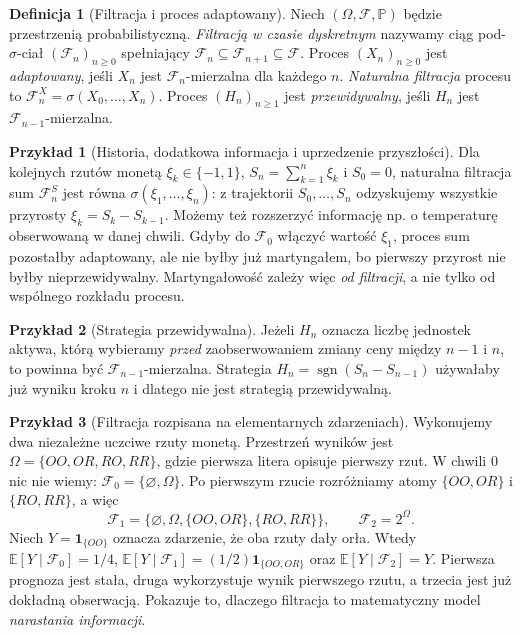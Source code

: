 \documentclass[11pt,a4paper,oneside]{report}
\numberwithin{equation}{chapter}
\theoremstyle{plain}
\theoremstyle{definition}
\newtheorem{definicja}{Definicja}[chapter]
\newtheorem{przyklad}{Przykład}[chapter]
\theoremstyle{remark}
\newcommand{\Prob}{\mathbb{P}}
\newcommand{\E}{\mathbb{E}}
\newcommand{\ind}[1]{\mathbf{1}_{#1}}
\begin{document}
\begin{definicja}[Filtracja i proces adaptowany]
Niech $(\Omega,\mathcal F,\Prob)$ będzie przestrzenią
probabilistyczną. \emph{Filtracją w czasie dyskretnym}
nazywamy ciąg pod-$\sigma$-ciał
$(\mathcal F_n)_{n\geq0}$ spełniający
$\mathcal F_n\subseteq\mathcal F_{n+1}\subseteq\mathcal F$.
Proces $(X_n)_{n\geq0}$ jest \emph{adaptowany}, jeśli
$X_n$ jest $\mathcal F_n$-mierzalna dla każdego $n$.
\emph{Naturalna filtracja} procesu to
$\mathcal F_n^X=\sigma(X_0,\ldots,X_n)$.
Proces $(H_n)_{n\geq1}$ jest \emph{przewidywalny},
jeśli $H_n$ jest $\mathcal F_{n-1}$-mierzalna.
\end{definicja}

\begin{przyklad}[Historia, dodatkowa informacja i uprzedzenie przyszłości]
Dla kolejnych rzutów monetą $\xi_k\in\{-1,1\}$,
$S_n=\sum_{k=1}^n\xi_k$ i $S_0=0$, naturalna
filtracja sum $\mathcal F_n^S$ jest równa
$\sigma(\xi_1,\ldots,\xi_n)$: z trajektorii
$S_0,\ldots,S_n$ odzyskujemy wszystkie przyrosty
$\xi_k=S_k-S_{k-1}$. Możemy też rozszerzyć informację
np. o temperaturę obserwowaną w danej chwili.
Gdyby do $\mathcal F_0$ włączyć wartość
$\xi_1$, proces sum pozostałby adaptowany, ale
nie byłby już martyngałem, bo pierwszy przyrost
nie byłby nieprzewidywalny. Martyngałowość
zależy więc \emph{od filtracji}, a nie tylko od
wspólnego rozkładu procesu.
\end{przyklad}

\begin{przyklad}[Strategia przewidywalna]
Jeżeli $H_n$ oznacza liczbę jednostek aktywa,
którą wybieramy \emph{przed} zaobserwowaniem
zmiany ceny między $n-1$ i $n$, to powinna być
$\mathcal F_{n-1}$-mierzalna. Strategia
$H_n=\operatorname{sgn}(S_n-S_{n-1})$ używałaby
już wyniku kroku $n$ i dlatego nie jest
strategią przewidywalną.
\end{przyklad}


\begin{przyklad}[Filtracja rozpisana na elementarnych zdarzeniach]
Wykonujemy dwa niezależne uczciwe rzuty monetą.
Przestrzeń wyników jest
$\Omega=\{OO,OR,RO,RR\}$, gdzie pierwsza litera
opisuje pierwszy rzut. W chwili $0$ nic nie wiemy:
$\mathcal F_0=\{\varnothing,\Omega\}$. Po pierwszym
rzucie rozróżniamy atomy $\{OO,OR\}$ i $\{RO,RR\}$,
a więc
\[
\mathcal F_1=\{\varnothing,\Omega,
\{OO,OR\},\{RO,RR\}\},\qquad
\mathcal F_2=2^\Omega.
\]
Niech $Y=\ind{\{OO\}}$ oznacza zdarzenie,
że oba rzuty dały orła. Wtedy
$\E[Y\mid\mathcal F_0]=1/4$,
$\E[Y\mid\mathcal F_1]=(1/2)\ind{\{OO,OR\}}$
oraz $\E[Y\mid\mathcal F_2]=Y$.
Pierwsza prognoza jest stała, druga wykorzystuje wynik
pierwszego rzutu, a trzecia jest już dokładną
obserwacją. Pokazuje to, dlaczego filtracja
to matematyczny model \emph{narastania informacji}.
\end{przyklad}
\end{document}
